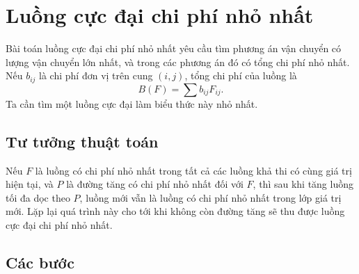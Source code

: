 \documentclass[11pt]{article}
\begin{document}
\section{Luồng cực đại chi phí nhỏ nhất}

Bài toán luồng cực đại chi phí nhỏ nhất yêu cầu tìm phương án vận chuyển có
lượng vận chuyển lớn nhất, và trong các phương án đó có tổng chi phí nhỏ nhất.
Nếu $b_{ij}$ là chi phí đơn vị trên cung $(i,j)$, tổng chi phí của luồng là
\[
  B(F)=\sum b_{ij}F_{ij}.
\]
Ta cần tìm một luồng cực đại làm biểu thức này nhỏ nhất.

\subsection{Tư tưởng thuật toán}

Nếu $F$ là luồng có chi phí nhỏ nhất trong tất cả các luồng khả thi có cùng
giá trị hiện tại, và $P$ là đường tăng có chi phí nhỏ nhất đối với $F$, thì
sau khi tăng luồng tối đa dọc theo $P$, luồng mới vẫn là luồng có chi phí nhỏ
nhất trong lớp giá trị mới. Lặp lại quá trình này cho tới khi không còn đường
tăng sẽ thu được luồng cực đại chi phí nhỏ nhất.

\subsection{Các bước}
\end{document}
